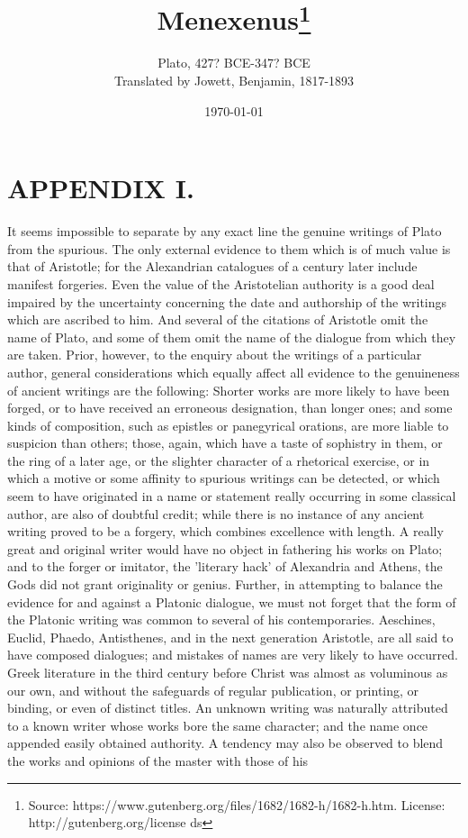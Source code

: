 \documentclass[11pt,letter]{article}
\begin{document}
\title{Menexenus\thanks{Source: https://www.gutenberg.org/files/1682/1682-h/1682-h.htm. License: http://gutenberg.org/license ds}}
\date{\today}
\author{Plato, 427? BCE-347? BCE\\ Translated by Jowett, Benjamin, 1817-1893}
\maketitle

\setcounter{tocdepth}{1}
\tableofcontents
\renewcommand{\baselinestretch}{1.0}
\normalsize
\newpage

\section{
      APPENDIX I.
    }
\par  It seems impossible to separate by any exact line the genuine writings of Plato from the spurious. The only external evidence to them which is of much value is that of Aristotle; for the Alexandrian catalogues of a century later include manifest forgeries. Even the value of the Aristotelian authority is a good deal impaired by the uncertainty concerning the date and authorship of the writings which are ascribed to him. And several of the citations of Aristotle omit the name of Plato, and some of them omit the name of the dialogue from which they are taken. Prior, however, to the enquiry about the writings of a particular author, general considerations which equally affect all evidence to the genuineness of ancient writings are the following: Shorter works are more likely to have been forged, or to have received an erroneous designation, than longer ones; and some kinds of composition, such as epistles or panegyrical orations, are more liable to suspicion than others; those, again, which have a taste of sophistry in them, or the ring of a later age, or the slighter character of a rhetorical exercise, or in which a motive or some affinity to spurious writings can be detected, or which seem to have originated in a name or statement really occurring in some classical author, are also of doubtful credit; while there is no instance of any ancient writing proved to be a forgery, which combines excellence with length. A really great and original writer would have no object in fathering his works on Plato; and to the forger or imitator, the 'literary hack' of Alexandria and Athens, the Gods did not grant originality or genius. Further, in attempting to balance the evidence for and against a Platonic dialogue, we must not forget that the form of the Platonic writing was common to several of his contemporaries. Aeschines, Euclid, Phaedo, Antisthenes, and in the next generation Aristotle, are all said to have composed dialogues; and mistakes of names are very likely to have occurred. Greek literature in the third century before Christ was almost as voluminous as our own, and without the safeguards of regular publication, or printing, or binding, or even of distinct titles. An unknown writing was naturally attributed to a known writer whose works bore the same character; and the name once appended easily obtained authority. A tendency may also be observed to blend the works and opinions of the master with those of his 
\end{document}
